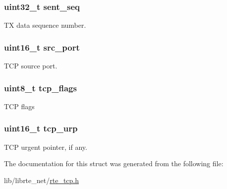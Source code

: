 \subsubsection[{sent\+\_\+seq}]{\setlength{\rightskip}{0pt plus 5cm}uint32\+\_\+t sent\+\_\+seq}\label{structtcp__hdr_abd310b02bdd70401a746bd58b2a2ba66}
T\+X data sequence number. \hypertarget{structtcp__hdr_ab98974981cf4c143fcee028643f313e6}{}
\subsubsection[{src\+\_\+port}]{\setlength{\rightskip}{0pt plus 5cm}uint16\+\_\+t src\+\_\+port}\label{structtcp__hdr_ab98974981cf4c143fcee028643f313e6}
T\+C\+P source port. \hypertarget{structtcp__hdr_ab393c6d5f386ec83c49c7e1496fbb0e1}{}
\subsubsection[{tcp\+\_\+flags}]{\setlength{\rightskip}{0pt plus 5cm}uint8\+\_\+t tcp\+\_\+flags}\label{structtcp__hdr_ab393c6d5f386ec83c49c7e1496fbb0e1}
T\+C\+P flags \hypertarget{structtcp__hdr_a1296ff9f24d461b188d953f1b56f6d1f}{}
\subsubsection[{tcp\+\_\+urp}]{\setlength{\rightskip}{0pt plus 5cm}uint16\+\_\+t tcp\+\_\+urp}\label{structtcp__hdr_a1296ff9f24d461b188d953f1b56f6d1f}
T\+C\+P urgent pointer, if any. 

The documentation for this struct was generated from the following file\+:\begin{DoxyCompactItemize}
\item 
lib/librte\+\_\+net/\hyperlink{rte__tcp_8h}{rte\+\_\+tcp.\+h}\end{DoxyCompactItemize}
